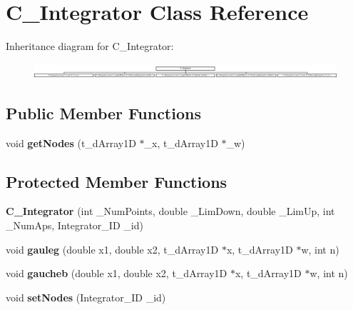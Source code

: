 \hypertarget{class_c___integrator}{\section{C\-\_\-\-Integrator Class Reference}
\label{class_c___integrator}
}
Inheritance diagram for C\-\_\-\-Integrator\-:\begin{figure}[H]
\begin{center}
\leavevmode
\includegraphics[height=0.560000cm]{class_c___integrator}
\end{center}
\end{figure}
\subsection*{Public Member Functions}
\begin{DoxyCompactItemize}
\item 
\hypertarget{class_c___integrator_a4f2868903ce7d38b4b66622bdd55325b}{void {\bfseries get\-Nodes} (t\-\_\-d\-Array1\-D $\ast$\-\_\-x, t\-\_\-d\-Array1\-D $\ast$\-\_\-w)}\label{class_c___integrator_a4f2868903ce7d38b4b66622bdd55325b}

\end{DoxyCompactItemize}
\subsection*{Protected Member Functions}
\begin{DoxyCompactItemize}
\item 
\hypertarget{class_c___integrator_ac21d41cb76646a55f6ca0217b4a36328}{{\bfseries C\-\_\-\-Integrator} (int \-\_\-\-Num\-Points, double \-\_\-\-Lim\-Down, double \-\_\-\-Lim\-Up, int \-\_\-\-Num\-Aps, Integrator\-\_\-\-I\-D \-\_\-id)}\label{class_c___integrator_ac21d41cb76646a55f6ca0217b4a36328}

\item 
\hypertarget{class_c___integrator_a1c27517c8d2b70e8aafd436ce26e929e}{void {\bfseries gauleg} (double x1, double x2, t\-\_\-d\-Array1\-D $\ast$x, t\-\_\-d\-Array1\-D $\ast$w, int n)}\label{class_c___integrator_a1c27517c8d2b70e8aafd436ce26e929e}

\item 
\hypertarget{class_c___integrator_ac451fb1760d5d1db6c2204c6dfa5a768}{void {\bfseries gaucheb} (double x1, double x2, t\-\_\-d\-Array1\-D $\ast$x, t\-\_\-d\-Array1\-D $\ast$w, int n)}\label{class_c___integrator_ac451fb1760d5d1db6c2204c6dfa5a768}

\item 
\hypertarget{class_c___integrator_a948956e93ee23a033ef53038d63e109d}{void {\bfseries set\-Nodes} (Integrator\-\_\-\-I\-D \-\_\-id)}\label{class_c___integrator_a948956e93ee23a033ef53038d63e109d}

\end{DoxyCompactItemize}
